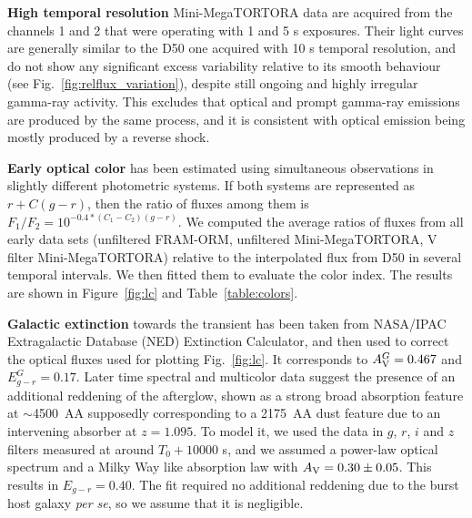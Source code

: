 \documentclass{naturesubmissionstyle}
\begin{document}
{\bf High temporal resolution} Mini-MegaTORTORA data are acquired from the channels 1 and 2 that were operating with 1 and 5 s exposures. Their light curves are generally similar to the D50 one acquired with 10 s temporal resolution, and do not show any significant excess variability relative to its smooth behaviour (see Fig.~\ref{fig:relflux_variation}), despite still ongoing and highly irregular gamma-ray activity. This excludes that optical and prompt gamma-ray emissions are produced by the same process, and it is consistent with optical emission being mostly produced by a reverse shock.

{\bf Early optical color} has been estimated using simultaneous observations in slightly different photometric systems. If both systems are represented as $r + C(g-r)$, then the ratio of fluxes among them is $F_1/F_2 = 10^{-0.4*(C_1-C_2)(g-r)}$. We computed the average ratios of fluxes from all early data sets (unfiltered FRAM-ORM, unfiltered Mini-MegaTORTORA, V filter Mini-MegaTORTORA) relative to the interpolated flux from D50 in several temporal intervals. We then fitted them to evaluate the color index. The results are shown in Figure~\ref{fig:lc} and Table~\ref{table:colors}.

{\bf Galactic extinction} towards the transient has been taken from NASA/IPAC Extragalactic Database (NED) Extinction Calculator, and then used to correct the optical fluxes used for plotting Fig.~\ref{fig:lc}. It corresponds to $A_{\rm V}^G=0.467$ and $E_{g-r}^G=0.17$. %
Later time spectral\cite{gcn_redshift}
and multicolor\cite{gcn_30271} data suggest the presence of an additional reddening of the afterglow, %
shown as a strong broad absorption feature at $\sim$4500~AA supposedly corresponding to a 2175~AA dust feature due to an intervening absorber at $z=1.095$. 
To model it, we used the data\cite{gcn_30271} in $g$, $r$, $i$ and $z$ filters measured at around $T_0+10000$ s, and we assumed a power-law optical spectrum and a Milky Way like absorption law\cite{pei92} with $A_{\rm V}=0.30\pm0.05$. This results in $E_{g-r}=0.40$. The fit required no additional reddening due to the burst host galaxy \textit{per se}, so we assume that it is negligible.

{\bf }
\end{document}
